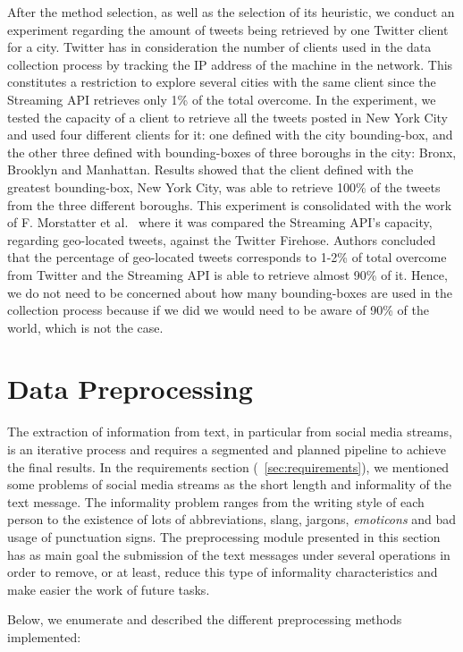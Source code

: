 After the method selection, as well as the selection of its heuristic, we conduct an experiment regarding the amount of tweets being retrieved by one Twitter client for a city. Twitter has in consideration the number of clients used in the data collection process by tracking the IP address of the machine in the network. This constitutes a restriction to explore several cities with the same client since the Streaming API retrieves only 1\% of the total overcome. In the experiment, we tested the capacity of a client to retrieve all the tweets posted in New York City and used four different clients for it: one defined with the city bounding-box, and the other three defined with bounding-boxes of three boroughs in the city: Bronx, Brooklyn and Manhattan. Results showed that the client defined with the greatest bounding-box, New York City, was able to retrieve 100\% of the tweets from the three different boroughs. This experiment is consolidated with the work of F. Morstatter et al.~\cite{morstatter2013sample} where it was compared the Streaming API's capacity, regarding geo-located tweets, against the Twitter Firehose. Authors concluded that the percentage of geo-located tweets corresponds to 1-2\% of total overcome from Twitter and the Streaming API is able to retrieve almost 90\% of it. Hence, we do not need to be concerned about how many bounding-boxes are used in the collection process because if we did we would  need to be aware of 90\% of the world, which is not the case.

\section{Data Preprocessing}\label{sec:data_preprocessing}
The extraction of information from text, in particular from social media streams, is an iterative process and requires a segmented and planned pipeline to achieve the final results. In the requirements section (~\ref{sec:requirements}), we mentioned some problems of social media streams as the short length and informality of the text message. The informality problem ranges from the writing style of each person to the existence of lots of abbreviations, slang, jargons, \textit{emoticons} and bad usage of punctuation signs. The preprocessing module presented in this section has as main goal the submission of the text messages under several operations in order to remove, or at least, reduce this type of informality characteristics and make easier the work of future tasks. 

Below, we enumerate and described the different preprocessing methods implemented:

